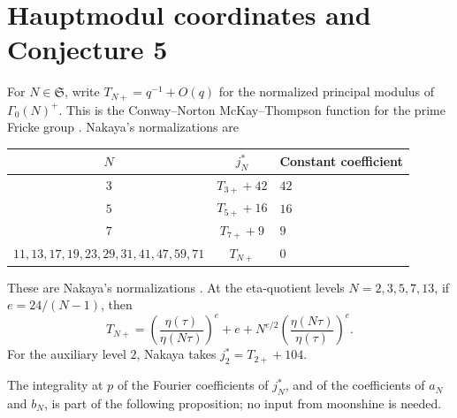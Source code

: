 \documentclass[11pt,a4paper]{article}
\theoremstyle{remark}\newtheorem{remark}[theorem]{Remark}
\numberwithin{equation}{section}
\begin{document}
	\section{Hauptmodul coordinates and Conjecture 5}\label{sec:haupt}
	For $N\in\mathfrak S$, write $T_{N+}=q^{-1}+O(q)$ for the normalized principal modulus of $\Gamma_0(N)^+$. This is the Conway--Norton McKay--Thompson function for the prime Fricke group \cite{CN}. Nakaya's normalizations are
	\begin{center}
		\begin{tabular}{ccl}\toprule
			$N$ & $j_N^*$ & Constant coefficient\\\midrule
			$3$ & $T_{3+}+42$ & $42$\\
			$5$ & $T_{5+}+16$ & $16$\\
			$7$ & $T_{7+}+9$ & $9$\\
			$11,13,17,19,23,29,31,41,47,59,71$ & $T_{N+}$ & $0$\\\bottomrule
		\end{tabular}
	\end{center}
	These are Nakaya's normalizations \cite[Section 4.1]{Nakaya}. At the eta-quotient levels $N=2,3,5,7,13$, if $e=24/(N-1)$, then
	\begin{equation}\label{eq:eta}
		T_{N+}=\left(\frac{\eta(\tau)}{\eta(N\tau)}\right)^e
		+e+N^{e/2}\left(\frac{\eta(N\tau)}{\eta(\tau)}\right)^e.
	\end{equation}
	For the auxiliary level $2$, Nakaya takes $j_2^*=T_{2+}+104$.
	
	The integrality at $p$ of the Fourier coefficients of $j_N^*$, and of the coefficients of $a_N$ and $b_N$, is part of the following proposition; no input from moonshine is needed.
	
\end{document}
